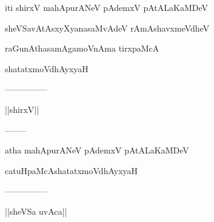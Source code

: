 \documentclass{article}
\begin{document}
\begin{center}
iti shirxV mahApurANeV pAdemxV pAtALaKaMDeV
\end{center}

\begin{center}
sheVSavAtAsxyXyanasaMvAdeV rAmAshavxmeVdheV
\end{center}

\begin{center}
raGunAthasamAgamoVnAma tirxpaMcA
\end{center}

\begin{center}
shatatxmoVdhAyxyaH
\end{center}

\begin{center}
---------------
\end{center}

\begin{center}
||shirxV||
\end{center}

\begin{center}
--------
\end{center}

\begin{center}
atha mahApurANeV pAdemxV pAtALaKaMDeV
\end{center}

\begin{center}
catuHpaMcAshatatxmoVdhAyxyaH
\end{center}

\begin{center}
---------------
\end{center}

\begin{center}
||sheVSa uvAca||
\end{center}
\end{document}
